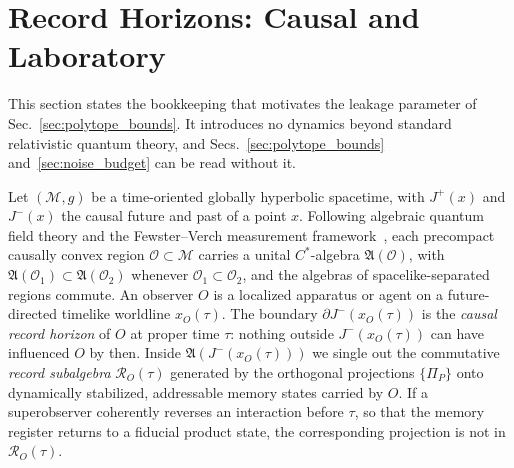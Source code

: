 \section{Record Horizons: Causal and Laboratory}
\label{sec:horizons}

This section states the bookkeeping that motivates the leakage parameter of Sec.~\ref{sec:polytope_bounds}. It introduces no dynamics beyond standard relativistic quantum theory, and Secs.~\ref{sec:polytope_bounds} and~\ref{sec:noise_budget} can be read without it.

Let $(\mathcal{M}, g)$ be a time-oriented globally hyperbolic spacetime, with $J^+(x)$ and $J^-(x)$ the causal future and past of a point $x$. Following algebraic quantum field theory and the Fewster--Verch measurement framework~\cite{fewster2020,alves2024}, each precompact causally convex region $\mathcal{O} \subset \mathcal{M}$ carries a unital $C^*$-algebra $\mathfrak{A}(\mathcal{O})$, with $\mathfrak{A}(\mathcal{O}_1) \subset \mathfrak{A}(\mathcal{O}_2)$ whenever $\mathcal{O}_1 \subset \mathcal{O}_2$, and the algebras of spacelike-separated regions commute. An observer $O$ is a localized apparatus or agent on a future-directed timelike worldline $x_O(\tau)$. The boundary $\partial J^-(x_O(\tau))$ is the \emph{causal record horizon} of $O$ at proper time $\tau$: nothing outside $J^-(x_O(\tau))$ can have influenced $O$ by then. Inside $\mathfrak{A}(J^-(x_O(\tau)))$ we single out the commutative \emph{record subalgebra} $\mathcal{R}_O(\tau)$ generated by the orthogonal projections $\{\Pi_P\}$ onto dynamically stabilized, addressable memory states carried by $O$. If a superobserver coherently reverses an interaction before $\tau$, so that the memory register returns to a fiducial product state, the corresponding projection is not in $\mathcal{R}_O(\tau)$.

